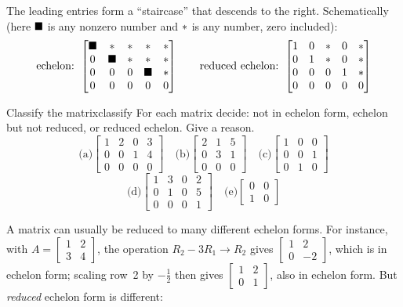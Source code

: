 \documentclass[11pt]{article}
\begin{document}
The leading entries form a ``staircase'' that descends to the right. Schematically (here $\blacksquare$ is any
nonzero number and $\ast$ is any number, zero included):
\[
\text{echelon: }
\begin{bmatrix}\blacksquare&\ast&\ast&\ast&\ast\\0&\blacksquare&\ast&\ast&\ast\\0&0&0&\blacksquare&\ast\\0&0&0&0&0\end{bmatrix}
\qquad
\text{reduced echelon: }
\begin{bmatrix}1&0&\ast&0&\ast\\0&1&\ast&0&\ast\\0&0&0&1&\ast\\0&0&0&0&0\end{bmatrix}
\]
 
\begin{kc}{Classify the matrix}{classify}
For each matrix decide: not in echelon form, echelon but not reduced, or reduced echelon. Give a reason.
\[
\text{(a)}\begin{bmatrix}1&2&0&3\\0&0&1&4\\0&0&0&0\end{bmatrix}\quad
\text{(b)}\begin{bmatrix}2&1&5\\0&3&1\\0&0&0\end{bmatrix}\quad
\text{(c)}\begin{bmatrix}1&0&0\\0&0&1\\0&1&0\end{bmatrix}
\]
\[
\text{(d)}\begin{bmatrix}1&3&0&2\\0&1&0&5\\0&0&0&1\end{bmatrix}\quad
\text{(e)}\begin{bmatrix}0&0\\1&0\end{bmatrix}
\]
\end{kc}
 
A matrix can usually be reduced to many different echelon forms. For instance, with
$A=\begin{bmatrix}1&2\\3&4\end{bmatrix}$, the operation $R_2-3R_1\to R_2$ gives
$\begin{bmatrix}1&2\\0&-2\end{bmatrix}$, which is in echelon form; scaling row~2 by $-\tfrac12$ then gives
$\begin{bmatrix}1&2\\0&1\end{bmatrix}$, also in echelon form. But \emph{reduced} echelon form is different:
 
\end{document}

